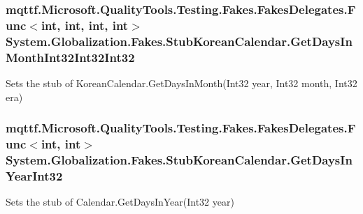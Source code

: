 \hypertarget{class_system_1_1_globalization_1_1_fakes_1_1_stub_korean_calendar_aa2dacede3a246adb39caf737f9b52b55}{
\subsubsection[{Get\-Days\-In\-Month\-Int32\-Int32\-Int32}]{\setlength{\rightskip}{0pt plus 5cm}mqttf.\-Microsoft.\-Quality\-Tools.\-Testing.\-Fakes.\-Fakes\-Delegates.\-Func$<$int, int, int, int$>$ System.\-Globalization.\-Fakes.\-Stub\-Korean\-Calendar.\-Get\-Days\-In\-Month\-Int32\-Int32\-Int32}}\label{class_system_1_1_globalization_1_1_fakes_1_1_stub_korean_calendar_aa2dacede3a246adb39caf737f9b52b55}


Sets the stub of Korean\-Calendar.\-Get\-Days\-In\-Month(\-Int32 year, Int32 month, Int32 era)

\hypertarget{class_system_1_1_globalization_1_1_fakes_1_1_stub_korean_calendar_a8b279b3b70fcac0b4feba841579569f9}{
\subsubsection[{Get\-Days\-In\-Year\-Int32}]{\setlength{\rightskip}{0pt plus 5cm}mqttf.\-Microsoft.\-Quality\-Tools.\-Testing.\-Fakes.\-Fakes\-Delegates.\-Func$<$int, int$>$ System.\-Globalization.\-Fakes.\-Stub\-Korean\-Calendar.\-Get\-Days\-In\-Year\-Int32}}\label{class_system_1_1_globalization_1_1_fakes_1_1_stub_korean_calendar_a8b279b3b70fcac0b4feba841579569f9}


Sets the stub of Calendar.\-Get\-Days\-In\-Year(\-Int32 year)

